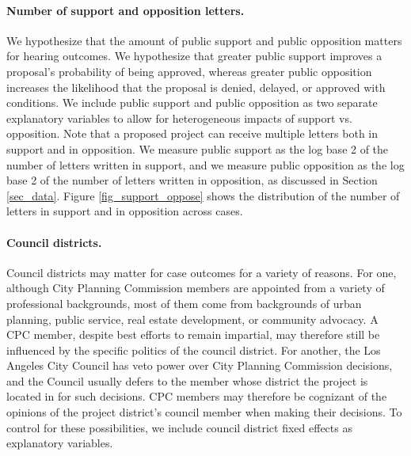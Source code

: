 \paragraph{Number of support and opposition letters.} We hypothesize that the amount of public support and public opposition matters for hearing outcomes. We hypothesize that greater public support improves a proposal's probability of being approved, whereas greater public opposition increases the likelihood that the proposal is denied, delayed, or approved with conditions. We include public support and public opposition as two separate explanatory variables to allow for heterogeneous impacts of support vs. opposition. Note that a proposed project can receive multiple letters both in support and in opposition. We measure public support as the log base 2 of the number of letters written in support, and we measure public opposition as the log base 2 of the number of letters written in opposition, as discussed in Section \ref{sec_data}. Figure \ref{fig_support_oppose} shows the distribution of the number of letters in support and in opposition across cases. 

\paragraph{Council districts.} Council districts may matter for case outcomes for a variety of reasons. For one, although City Planning Commission members are appointed from a variety of professional backgrounds, most of them come from backgrounds of urban planning, public service, real estate development, or community advocacy. A CPC member, despite best efforts to remain impartial, may therefore still be influenced by the specific politics of the council district. For another, the Los Angeles City Council has veto power over City Planning Commission decisions, and the Council usually defers to the member whose district the project is located in for such decisions. CPC members may therefore be cognizant of the opinions of the project district's council member when making their decisions. To control for these possibilities, we include council district fixed effects as explanatory variables.

